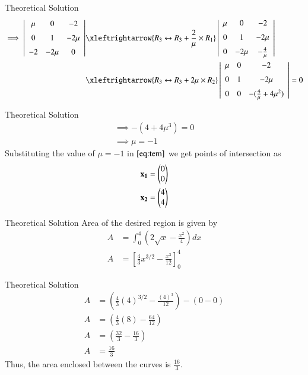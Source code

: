 \documentclass{beamer}
\begin{document}
\begin{frame}{Theoretical Solution}
\begin{align}
\implies \left|
\begin{array}{ccc}
\mu & 0 & -2 \\[6pt]
0 & 1  & -2\mu \\[6pt]
-2 & -2\mu & 0
\end{array}
\right| &\xleftrightarrow{R_3 \leftrightarrow R_3 + \frac{2}{\mu}\times R_1} \left|
\begin{array}{ccc}
\mu & 0 & -2 \\[6pt]
0 & 1  & -2\mu \\[6pt]
0 & -2\mu & -\frac{4}{\mu}
\end{array}
\right|\\
&\xleftrightarrow{R_3 \leftrightarrow R_3 + 2\mu \times R_2} \left|
\begin{array}{ccc}
\mu & 0 & -2 \\[6pt]
0 & 1  & -2\mu \\[6pt]
0 & 0 & -(\frac{4}{\mu} +4 \mu ^2)
\end{array}
\right| =0
\end{align}
\end{frame}

\begin{frame}{Theoretical Solution}
\begin{align}
\implies -(4 + 4 \mu ^3)=0\\
\implies \mu=-1
\end{align}
Substituting the value of $\mu=-1$ in $\eqref{eq:tem}$ we get points of intersection as 
\begin{align}
    \mathbf{x_1}=\begin{pmatrix}0\\0\end{pmatrix} \\
    \mathbf{x_2}=\begin{pmatrix}4\\4\end{pmatrix}
\end{align}
\end{frame}

\begin{frame}{Theoretical Solution}
Area of the desired region is given by
\begin{align}
A &= \int_{0}^{4}\left(2\sqrt{x}-\frac{x^2}{4}\right)dx\\
A &= \left[\frac{4}{3}x^{3/2} - \frac{x^3}{12}\right]_{0}^{4}
\end{align}
\end{frame}

\begin{frame}{Theoretical Solution}
\begin{align}
A &= \left(\frac{4}{3}(4)^{3/2} - \frac{(4)^3}{12}\right) - \left(0 - 0\right)\\
A &= \left(\frac{4}{3}(8) - \frac{64}{12}\right)\\
A &= \left(\frac{32}{3} - \frac{16}{3}\right)\\
A &= \frac{16}{3}
\end{align}
Thus, the area enclosed between the curves is $\frac{16}{3}$.
\end{frame}
\end{document}
